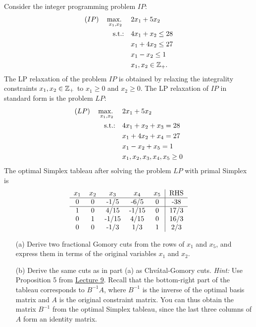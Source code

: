 Consider the integer programming problem $IP$:
\begin{align*}
(IP) \quad \mathop{\text{max.~}}_{x_1,x_2} \quad  & 2x_1+5x_2 \\
\mathop{\text{s.t.:~}}   ~~ & 4x_1 + x_2 \leq 28 \\
      & x_1 + 4x_2 \leq 27 \\
      & x_1-x_2 \leq 1\\
      & x_1,x_2 \in \mathbb{Z}_+.
\end{align*}
The LP relaxation of the problem $IP$ is obtained by relaxing the integrality constraints $x_1,x_2\in \mathbb{Z}_+$ to $x_1 \geq 0$ and $x_2 \geq 0$. The LP relaxation of $IP$ in standard form is the problem $LP$:
\begin{align*}
(LP) \quad \mathop{\text{max.~}}_{x_1,x_2} \quad  & 2x_1+5x_2 \\
\mathop{\text{s.t.:~}}   ~~ & 4x_1 + x_2 + x_3 = 28\\
      & x_1 + 4x_2 + x_4 = 27\\
      & x_1-x_2 + x_5  =  1\\
      & x_1,x_2,x_3,x_4,x_5\geq 0
\end{align*}
The optimal Simplex tableau after solving the problem $LP$ with primal Simplex is
\renewcommand*{\arraystretch}{1.2}
\[
\begin{tabular}{ccccc|c}
       $x_1$& $x_2$ & $x_3$ & $x_4$ & $x_5$ & RHS  \\
\hline
      0 & 0 & -1/5  & -6/5 & 0   & -38 \\
\hline
      1 & 0 & 4/15  & -1/15 & 0 & 17/3 \\
      0 & 1 & -1/15 & 4/15  & 0 & 16/3 \\
      0 & 0 & -1/3  & 1/3   & 1 & 2/3
\end{tabular}
\]

\begin{itemize}
\item[(a)] Derive two fractional Gomory cuts from the rows of $x_1$ and $x_5$, and express them in terms of the original variables $x_1$ and $x_2$.
\item[(b)] Derive the same cuts as in part (a) as Chv\'{a}tal-Gomory cuts. \emph{Hint:} Use Proposition 5 from \href{https://mycourses.aalto.fi/mod/folder/view.php?id=651663}{Lecture 9}. Recall that the bottom-right part of the tableau corresponds to $B^{-1}A$, where $B^{-1}$ is the inverse of the optimal basis matrix and $A$ is the original constraint matrix. You can thus obtain the matrix $B^{-1}$ from the optimal Simplex tableau, since the last three columns of $A$ form an identity matrix.
\end{itemize}
